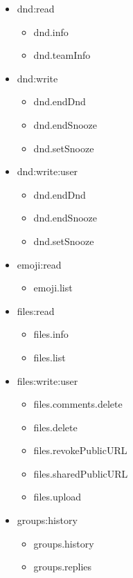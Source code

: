 \begin{multicols}{2}
\begin{itemize}
	\item dnd:read
	\begin{itemize}
		\item dnd.info
		\item dnd.teamInfo
	\end{itemize}
	
	\item dnd:write
	\begin{itemize}
		\item dnd.endDnd
		\item dnd.endSnooze
		\item dnd.setSnooze
	\end{itemize}
	
	\item dnd:write:user
	\begin{itemize}
		\item dnd.endDnd
		\item dnd.endSnooze
		\item dnd.setSnooze
	\end{itemize}
	
	\item emoji:read
	\begin{itemize}
		\item emoji.list
	\end{itemize}
	
	\item files:read
	\begin{itemize}
		\item files.info
		\item files.list
	\end{itemize}
	
	\item files:write:user
	\begin{itemize}
		\item files.comments.delete
		\item files.delete
		\item files.revokePublicURL
		\item files.sharedPublicURL
		\item files.upload
	\end{itemize}
	
	\item groups:history
	\begin{itemize}
		\item groups.history
		\item groups.replies
	\end{itemize}
	

\end{itemize}
\end{multicols}
